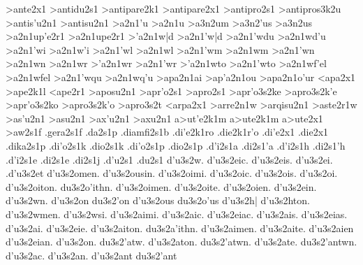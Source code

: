{>ante2x1    		%
>antidu2s1  		%
>antipare2k1 		%
>antipare2x1 		%
>antipro2s1 		%
	>antipros3k2u 		%
>antis'u2n1 		%
>antisu2n1
>a2n1'u   		%
>a2n1u
	>a3n2um 		%
	>a3n2'us 		%
	>a3n2us  		%
>a2n1up'e2r1 		%
>a2n1upe2r1
>'a2n1w|d		%
>a2n1'w|d
>a2n1'wdu  	%
>a2n1wd'u %
>a2n1'wi    		%
>a2n1w'i
>a2n1'wl     		%
>a2n1wl
>a2n1'wm 		%
>a2n1wm
>a2n1'wn 		%
>a2n1wn
>a2n1wr  		%
>'a2n1wr 		%
>a2n1'wr
>'a2n1wto 		%
>a2n1'wto
>a2n1wf'el  		%
>a2n1wfel   		%
>a2n1'wqu 		%
>a2n1wq'u
>apa2n1ai 		%
>ap'a2n1ou 		%
>apa2n1o'ur
<apa2x1       		%
>ape2k1l 		%
<ape2r1      		%
>aposu2n1 		%
>apr'o2s1 		%
>apro2s1
	>apr'o3s2ke 		%
	>apro3s2k'e
	>apr'o3s2ko 		%
	>apro3s2k'o
	>apro3s2t 		%
<arpa2x1 		%
>arre2n1w 		%
>arqisu2n1 		%
>aste2r1w    		%
>as'u2n1     		%
>asu2n1
>ax'u2n1  		%
>axu2n1
a>ut'e2k1m 		%
a>ute2k1m
a>ute2x1   		%
>aw2s1f    		%
.gera2s1f  		%
.da2s1p    		%
.diamfi2s1b 		%
.di'e2k1ro 		%
.die2k1r'o
.di'e2x1   		%
.die2x1    		%
.dika2s1p  		%
.di'o2s1k  		%
.dio2s1k
.di'o2s1p		%
.dio2s1p
.d'i2s1a       		%
.di2s1'a
.d'i2s1h   		%
.di2s1'h
.d'i2s1e   		%
.di2s1e
.di2s1j    		%
.d'u2s1    		%
.du2s1
%
	d'u3s2w.  		%
	d'u3s2eic.
	d'u3s2eis.
	d'u3s2ei.
	.d'u3s2et
	d'u3s2omen.
	d'u3s2ousin.
	d'u3s2oimi.
	d'u3s2oic.
	d'u3s2ois.
	d'u3s2oi.
	d'u3s2oiton.
	du3s2o'ithn.
	d'u3s2oimen.
	d'u3s2oite.
	d'u3s2oien.
	d'u3s2ein.
	d'u3s2wn. d'u3s2on du3s2'on
	d'u3s2ous du3s2o'us
	d'u3s2h|
	d'u3s2hton.
	d'u3s2wmen.
	d'u3s2wsi.
	d'u3s2aimi.
	d'u3s2aic. d'u3s2eiac.
	d'u3s2ais. d'u3s2eias.
	d'u3s2ai. d'u3s2eie.
	d'u3s2aiton.
	du3s2a'ithn.
	d'u3s2aimen.
	d'u3s2aite.
	d'u3s2aien d'u3s2eian.
	d'u3s2on.
	du3s2'atw.
	d'u3s2aton.
	du3s2'atwn.
	d'u3s2ate.
	du3s2'antwn.
	d'u3s2ac. d'u3s2an. d'u3s2ant du3s2'ant
}
